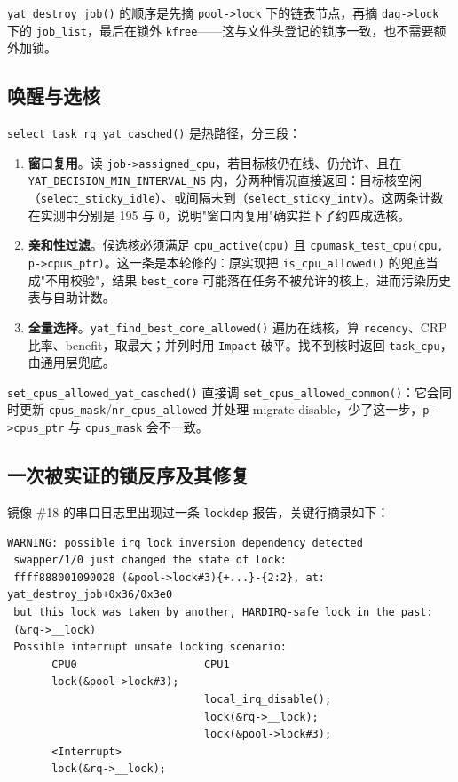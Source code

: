 \texttt{yat\_destroy\_job()} 的顺序是先摘 \texttt{pool->lock} 下的链表节点，再摘 \texttt{dag->lock} 下的 \texttt{job\_list}，最后在锁外 \texttt{kfree}——这与文件头登记的锁序一致，也不需要额外加锁。

\subsection{唤醒与选核}

\texttt{select\_task\_rq\_yat\_casched()} 是热路径，分三段：

\begin{enumerate}
  \item \textbf{窗口复用}。读 \texttt{job->assigned\_cpu}，若目标核仍在线、仍允许、且在 \texttt{YAT\_DECISION\_MIN\_INTERVAL\_NS} 内，分两种情况直接返回：目标核空闲（\texttt{select\_sticky\_idle}）、或间隔未到（\texttt{select\_sticky\_intv}）。这两条计数在实测中分别是 195 与 0，说明"窗口内复用"确实拦下了约四成选核。
  \item \textbf{亲和性过滤}。候选核必须满足 \texttt{cpu\_active(cpu)} 且 \texttt{cpumask\_test\_cpu(cpu, p->cpus\_ptr)}。这一条是本轮修的：原实现把 \texttt{is\_cpu\_allowed()} 的兜底当成"不用校验"，结果 \texttt{best\_core} 可能落在任务不被允许的核上，进而污染历史表与自助计数。
  \item \textbf{全量选择}。\texttt{yat\_find\_best\_core\_allowed()} 遍历在线核，算 \texttt{recency}、CRP 比率、benefit，取最大；并列时用 \texttt{Impact} 破平。找不到核时返回 \texttt{task\_cpu}，由通用层兜底。
\end{enumerate}

\texttt{set\_cpus\_allowed\_yat\_casched()} 直接调 \texttt{set\_cpus\_allowed\_common()}：它会同时更新 \texttt{cpus\_mask}/\texttt{nr\_cpus\_allowed} 并处理 migrate-disable，少了这一步，\texttt{p->cpus\_ptr} 与 \texttt{cpus\_mask} 会不一致。

\subsection{一次被实证的锁反序及其修复}

镜像 \#18 的串口日志里出现过一条 \texttt{lockdep} 报告，关键行摘录如下：

\begin{verbatim}
WARNING: possible irq lock inversion dependency detected
 swapper/1/0 just changed the state of lock:
 ffff888001090028 (&pool->lock#3){+...}-{2:2}, at: yat_destroy_job+0x36/0x3e0
 but this lock was taken by another, HARDIRQ-safe lock in the past:
 (&rq->__lock)
 Possible interrupt unsafe locking scenario:
       CPU0                    CPU1
       lock(&pool->lock#3);
                               local_irq_disable();
                               lock(&rq->__lock);
                               lock(&pool->lock#3);
       <Interrupt>
       lock(&rq->__lock);
\end{verbatim}

